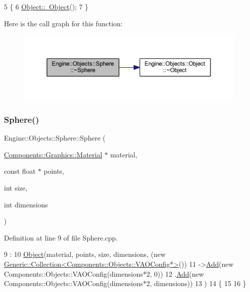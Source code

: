 \begin{DoxyCode}
5 \{
6     \mbox{\hyperlink{classEngine_1_1Objects_1_1Object_a5fc9cc004cae8e63c4fb1d2b6d1cea88}{Object::~Object}}();
7 \}
\end{DoxyCode}
Here is the call graph for this function\+:
\nopagebreak
\begin{figure}[H]
\begin{center}
\leavevmode
\includegraphics[width=350pt]{classEngine_1_1Objects_1_1Sphere_ae305cb7304701062e6930a6c48dd6d97_cgraph}
\end{center}
\end{figure}
\mbox{\label{classEngine_1_1Objects_1_1Sphere_a88f7519c022db552a6b4fa8e07d7718f}} 
\subsubsection{\texorpdfstring{Sphere()}{Sphere()}}
{\footnotesize\ttfamily Engine\+::\+Objects\+::\+Sphere\+::\+Sphere (\begin{DoxyParamCaption}\item[{\mbox{\hyperlink{classEngine_1_1Components_1_1Graphics_1_1Material}{Components\+::\+Graphics\+::\+Material}} $\ast$}]{material,  }\item[{const float $\ast$}]{points,  }\item[{int}]{size,  }\item[{int}]{dimensions }\end{DoxyParamCaption})}



Definition at line 9 of file Sphere.\+cpp.


\begin{DoxyCode}
9                                                                                                            
         :
10     \mbox{\hyperlink{classEngine_1_1Objects_1_1Object_a4798ee926dcbd761e7e88fdeb73f2f0a}{Object}}(material, points, size, dimensions, (\textcolor{keyword}{new} 
      \mbox{\hyperlink{classGeneric_1_1Collection}{Generic::Collection<Components::Objects::VAOConfig*>}}())
11         ->\mbox{\hyperlink{classEngine_1_1Components_1_1Objects_1_1VertexObject_a18550cae56ca1066792528a7dcf5d28a}{Add}}(\textcolor{keyword}{new} Components::Objects::VAOConfig(dimensions*2, 0))
12         .\mbox{\hyperlink{classEngine_1_1Components_1_1Objects_1_1VertexObject_a18550cae56ca1066792528a7dcf5d28a}{Add}}(\textcolor{keyword}{new} Components::Objects::VAOConfig(dimensions*2, dimensions))
13     )
14 \{
15     
16 \}
\end{DoxyCode}


